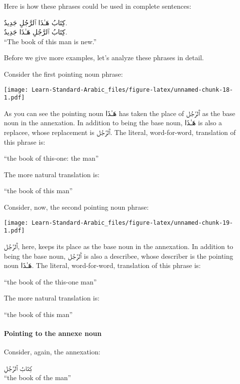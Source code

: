 \documentclass[
  10pt,
]{book}
\begin{document}
Here is how these phrases could be used in complete sentences:

\foreignlanguage{arabic}{کِتَابُ هَـٰذَا ٱلرَّجُلِ جَدِيدٌ.}\\
\foreignlanguage{arabic}{کِتَابُ ٱلرَّجُلِ هَـٰذَا جَدِيدٌ.}\\
\enquote{The book of this man is new.}

Before we give more examples, let's analyze these phrases in detail.

Consider the first pointing noun phrase:

\texttt{[image: Learn-Standard-Arabic\_files/figure-latex/unnamed-chunk-18-1.pdf]}

As you can see the pointing noun
\foreignlanguage{arabic}{هَـٰذَا} has taken the place of
\foreignlanguage{arabic}{ٱَلرَّجُل} as the base noun in the annexation.
In addition to being the base noun,
\foreignlanguage{arabic}{هَـٰذَا} is also a replacee, whose replacement is
\foreignlanguage{arabic}{ٱَلرَّجُل}.
The literal, word-for-word, translation of this phrase is:

\enquote{the book of this-one: the man}

The more natural translation is:

\enquote{the book of this man}

Consider, now, the second pointing noun phrase:

\texttt{[image: Learn-Standard-Arabic\_files/figure-latex/unnamed-chunk-19-1.pdf]}

\foreignlanguage{arabic}{ٱَلرَّجُل}, here, keeps its place as the base noun in the annexation.
In addition to being the base noun,
\foreignlanguage{arabic}{ٱَلرَّجُل}
is also a describee, whose describer is the pointing noun
\foreignlanguage{arabic}{هَـٰذَا}.
The literal, word-for-word, translation of this phrase is:

\enquote{the book of the this-one man}

The more natural translation is:

\enquote{the book of this man}

\paragraph{Pointing to the annexe noun}\label{pointing-to-the-annexe-noun}

Consider, again, the annexation:

\foreignlanguage{arabic}{کِتَابُ ٱلرَّجُلِ}\\
\enquote{the book of the man}
\end{document}
